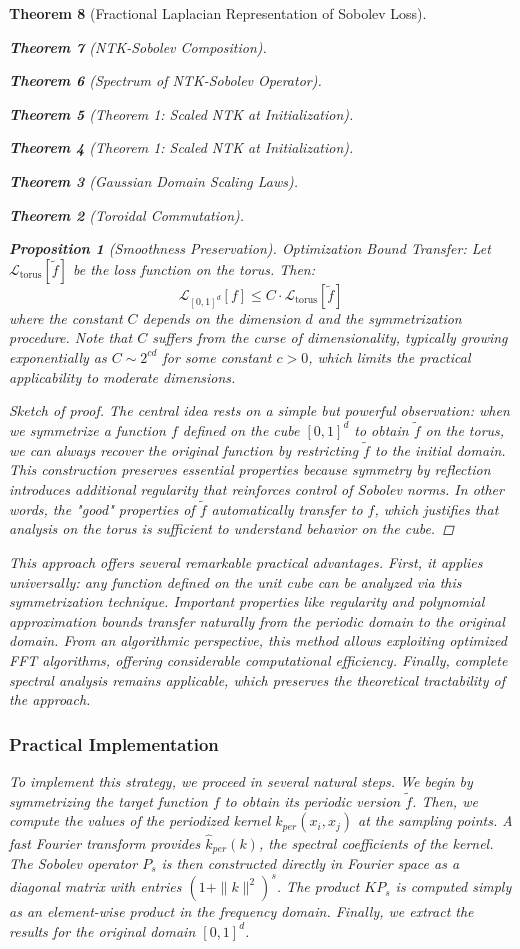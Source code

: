 \documentclass{article}
\newtheorem{theorem}{Theorem}[section]
\newtheorem{proposition}[theorem]{Proposition}
\begin{document}
\begin{theorem}[Fractional Laplacian Representation of Sobolev Loss]
\begin{theorem}[NTK-Sobolev Composition]
\begin{theorem}[Spectrum of NTK-Sobolev Operator]
\begin{theorem}[Theorem 1: Scaled NTK at Initialization]
\begin{theorem}[Theorem 1: Scaled NTK at Initialization]
\begin{theorem}[Gaussian Domain Scaling Laws]
\begin{theorem}[Toroidal Commutation]
\begin{proposition}[Smoothness Preservation]
Optimization Bound Transfer:
Let $\mathcal{L}_{\text{torus}}[\tilde{f}]$ be the loss function on the torus. Then:
\[ \mathcal{L}_{[0,1]^d}[f] \leq C \cdot \mathcal{L}_{\text{torus}}[\tilde{f}] \]
where the constant $C$ depends on the dimension $d$ and the symmetrization procedure. Note that $C$ suffers from the curse of dimensionality, typically growing exponentially as $C \sim 2^{cd}$ for some constant $c > 0$, which limits the practical applicability to moderate dimensions.

\begin{proof}[Sketch of proof]
The central idea rests on a simple but powerful observation: when we symmetrize a function $f$ defined on the cube $[0,1]^d$ to obtain $\tilde{f}$ on the torus, we can always recover the original function by restricting $\tilde{f}$ to the initial domain. This construction preserves essential properties because symmetry by reflection introduces additional regularity that reinforces control of Sobolev norms. In other words, the "good" properties of $\tilde{f}$ automatically transfer to $f$, which justifies that analysis on the torus is sufficient to understand behavior on the cube.
\end{proof}

This approach offers several remarkable practical advantages. First, it applies universally: any function defined on the unit cube can be analyzed via this symmetrization technique. Important properties like regularity and polynomial approximation bounds transfer naturally from the periodic domain to the original domain. From an algorithmic perspective, this method allows exploiting optimized FFT algorithms, offering considerable computational efficiency. Finally, complete spectral analysis remains applicable, which preserves the theoretical tractability of the approach.

\subsubsection{Practical Implementation}

To implement this strategy, we proceed in several natural steps. We begin by symmetrizing the target function $f$ to obtain its periodic version $\tilde{f}$. Then, we compute the values of the periodized kernel $k_{per}(x_i, x_j)$ at the sampling points. A fast Fourier transform provides $\hat{k}_{per}(k)$, the spectral coefficients of the kernel. The Sobolev operator $P_s$ is then constructed directly in Fourier space as a diagonal matrix with entries $(1 + \|k\|^2)^s$. The product $KP_s$ is computed simply as an element-wise product in the frequency domain. Finally, we extract the results for the original domain $[0,1]^d$.


\end{proposition}
\end{theorem}
\end{theorem}
\end{theorem}
\end{theorem}
\end{theorem}
\end{theorem}
\end{theorem}
\end{document}
